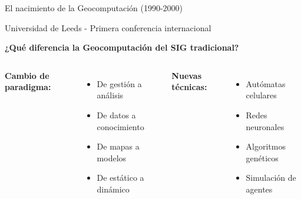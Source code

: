 \documentclass[10pt]{beamer}
\newcommand{\examplebox}[2]{
\begin{tcolorbox}[colframe=usachblue,colback=white,title=#1,fonttitle=\small,fontlower=\small]
#2
\end{tcolorbox}
}
\begin{document}
\begin{frame}{El nacimiento de la Geocomputación (1990-2000)}
    \examplebox{Conferencia inaugural (1996)}{
        Universidad de Leeds - Primera conferencia internacional
    }
    
    \textbf{¿Qué diferencia la Geocomputación del SIG tradicional?}
    
    \begin{columns}
        \textbf{Cambio de paradigma:}
        \begin{itemize}
            \item De gestión a análisis
            \item De datos a conocimiento
            \item De mapas a modelos
            \item De estático a dinámico
        \end{itemize}
        
        \textbf{Nuevas técnicas:}
        \begin{itemize}
            \item Autómatas celulares
            \item Redes neuronales
            \item Algoritmos genéticos
            \item Simulación de agentes
        \end{itemize}
    \end{columns}
\end{frame}
\end{document}

